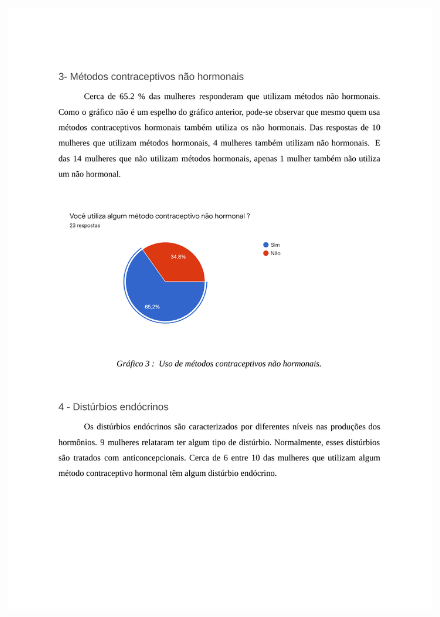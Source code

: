 \begin{apendicesenv}
        \begin{figure}[ht]
            \centering
            \includegraphics[keepaspectratio=true,scale=0.7]{figuras/Tab3.pdf}
        \end{figure}
        

\end{apendicesenv}
